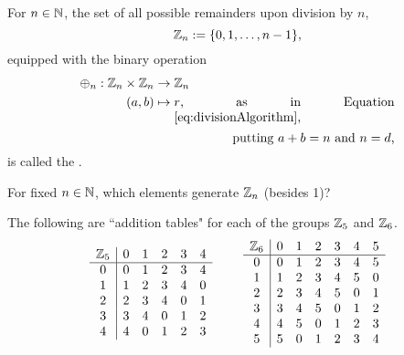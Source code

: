 \documentclass[../algebraNotesMSRI-UP2016.tex]{subfiles}
\begin{document}
\begin{frame}
%
\begin{dfn}\label{dfn:ZmodnZ}
For $n\in\mathbb N$, the set of all possible remainders upon division by $n$,
\[
\mathbb Z_n:=\{0,1,\dots,n-1\},
\]
equipped with the binary operation
\begin{align*}
\oplus_n:\Z_n\times \Z_n &\to \Z_n \\
	(a,b) &\mapsto \parbox[t]{0.5\textwidth}{
		$r$, as in Equation \eqref{eq:divisionAlgorithm}, 
		\vspace{-0.3pc}
		\flushright putting $a+b=n$ and $n=d$,}
\end{align*}
is called the .
\end{dfn}
%
\smallGap
\begin{que}[cf. Problem 57]
For fixed $n\in\mathbb N$, which elements generate $\mathbb Z_n$ (besides 1)?
\end{que}
%
%
\end{frame}

\begin{frame}[c]{}{}
\begin{ex}[cf. Problem 56]
The following are ``addition tables" for each of the groups $\mathbb Z_5$ %
and $\mathbb Z_6$. %
\[
\begin{array}{c | c c c c c }
 \Z_5 & 0 & 1 & 2 & 3 & 4 \\
 \hline
 0 & 0 & 1 & 2 & 3 & 4 \\ 
 1 & 1 & 2 & 3 & 4 & 0 \\
 2 & 2 & 3 & 4 & 0 & 1 \\
 3 & 3 & 4 & 0 & 1 & 2 \\
 4 & 4 & 0 & 1 & 2 & 3 
\end{array}
\hspace{2pc}
\begin{array}{c | c c c c c c }
 \Z_6  & 0 & 1 & 2 & 3 & 4 & 5 \\
 \hline
 0 & 0 & 1 & 2 & 3 & 4 & 5 \\ 
 1 & 1 & 2 & 3 & 4 & 5 & 0 \\
 2 & 2 & 3 & 4 & 5 & 0 & 1 \\
 3 & 3 & 4 & 5 & 0 & 1 & 2 \\
 4 & 4 & 5 & 0 & 1 & 2 & 3 \\
 5 & 5 & 0 & 1 & 2 & 3 & 4
\end{array}
\]	
\end{ex}
\end{frame}
\end{document}
